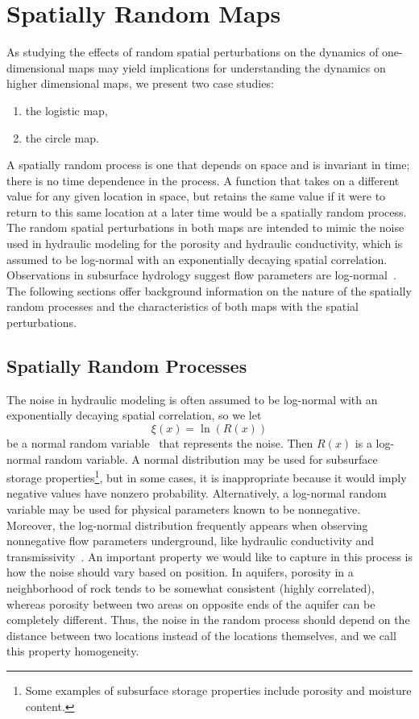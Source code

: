 \chapter{Spatially Random Maps}
As studying the effects of random spatial perturbations
on the dynamics of one-dimensional maps may yield implications for
understanding the dynamics on higher dimensional maps, we present two
case studies:
\begin{enumerate}
\item the logistic map,
\item the circle map.
\end{enumerate}
A spatially random process is one that depends on space and is
invariant in time; there is no time dependence in the process. A
function that takes on a different value for any given location in
space, but retains the same value if it were to return to this same
location at a later time would be a spatially random process. The random spatial perturbations in both maps are intended to mimic
the noise used in hydraulic modeling for the porosity and hydraulic
conductivity, which is assumed to be log-normal with an
exponentially decaying spatial correlation. Observations
in subsurface hydrology suggest flow parameters are
log-normal~\cite{gelhar}. The following sections offer background
information on the nature of the spatially random processes and the characteristics of both maps with the spatial perturbations. 
\section{Spatially Random Processes}\label{spatprocs}
The noise in hydraulic modeling is often assumed to be log-normal with an
exponentially decaying spatial correlation, so we let
\begin{equation}\label{R}
\xi(x)=\ln(R(x)) 
\end{equation}
be a normal random variable~\cite{gelhar} that represents the noise. Then
$R(x)$ is a log-normal random variable. A normal distribution may be used
for subsurface storage properties\footnote{Some examples of subsurface
storage properties include porosity and moisture content.}, but in some cases, it is
inappropriate because it would imply negative values have nonzero
probability. Alternatively, a log-normal random variable may
be used for physical parameters known to be nonnegative. Moreover, the log-normal distribution frequently appears when observing
nonnegative flow parameters underground, like hydraulic conductivity and
transmissivity~\cite{gelhar}. An important property we would like to
capture in this process is how the noise should vary based on
position. In aquifers, porosity in a neighborhood of rock tends to be
somewhat consistent (highly correlated), whereas porosity between two
areas on opposite ends of the aquifer can be completely
different. Thus, the noise in the random process should depend on the
distance between two locations instead of the locations themselves,
and we call this property homogeneity. 

